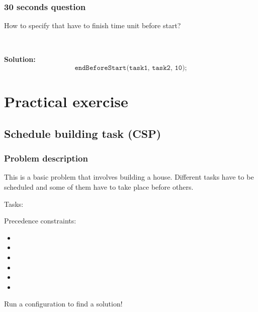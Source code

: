 \begin{frame} \frametitle{30 seconds question}

How to specify that  have to finish  time unit before  start?

\pause\medskip~\medskip

\textbf{Solution:} 
\begin{equation*}
\texttt{endBeforeStart(task1, task2, 10);} 
\end{equation*}

\end{frame}


\section{Practical exercise}

\subsection{Schedule building task (CSP)}


\begin{frame} \frametitle{Problem description}

This is a basic problem that involves building a house. Different tasks have to be scheduled and some of them have to take place before others. 

\pause\medskip

Tasks: 

\pause\medskip 

Precedence constraints:\pause
\begin{itemize}[<+->]
	\item {}
	\item {}
	\item {}
	\item {}
	\item {}
	\item {}	
\end{itemize}

\pause\medskip 

Run a configuration to find a solution!

\end{frame}

